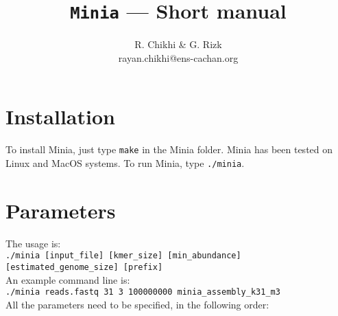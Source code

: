 \documentclass[a4paper]{article}
\begin{document}
\newcommand\vitem[1][]{\SaveVerb[%
    aftersave={\item[\textnormal{\UseVerb[#1]{vsave}}]}]{vsave}}

\title{\Huge \texttt{Minia} --- Short manual}

\author{R. Chikhi \& G. Rizk\\
        {\small{rayan.chikhi@ens-cachan.org}}}
\maketitle

\begin{abstract}
\end{abstract}

\tableofcontents

\section{Installation}

To install Minia, just type \verb+make+ in the Minia folder.
Minia has been tested on Linux and MacOS systems.
To run Minia, type \verb+./minia+.

\section{Parameters}

The usage is:\\


\verb+./minia [input_file] [kmer_size] [min_abundance] [estimated_genome_size] [prefix]+\\


An example command line is:\\


\verb+./minia reads.fastq 31 3 100000000 minia_assembly_k31_m3+\\

All the parameters need to be specified, in the following order:
\end{document}
